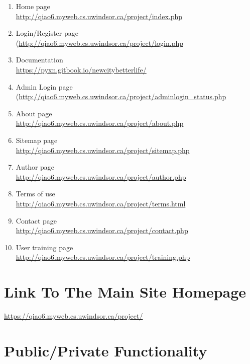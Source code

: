 \documentclass[12pt, letterpaper]{article}
\begin{document}
\begin{enumerate}
	\item Home page \\\url{http://qiao6.myweb.cs.uwindsor.ca/project/index.php}
	\item Login/Register page \\(\url{http://qiao6.myweb.cs.uwindsor.ca/project/login.php}
	\item Documentation \\\url{https://pyxn.gitbook.io/newcitybetterlife/}
	\item Admin Login page \\(\url{http://qiao6.myweb.cs.uwindsor.ca/project/adminlogin_status.php}
	\item About page \\\url{http://qiao6.myweb.cs.uwindsor.ca/project/about.php}
	\item Sitemap page \\\url{http://qiao6.myweb.cs.uwindsor.ca/project/sitemap.php}
	\item Author page \\\url{http://qiao6.myweb.cs.uwindsor.ca/project/author.php}
	\item Terms of use \\\url{http://qiao6.myweb.cs.uwindsor.ca/project/terms.html}
	\item Contact page \\\url{http://qiao6.myweb.cs.uwindsor.ca/project/contact.php}
	\item User training page \\\url{http://qiao6.myweb.cs.uwindsor.ca/project/training.php}
\end{enumerate}

\section{Link To The Main Site Homepage}
\url{https://qiao6.myweb.cs.uwindsor.ca/project/}

\section{Public/Private Functionality}
\end{document}
